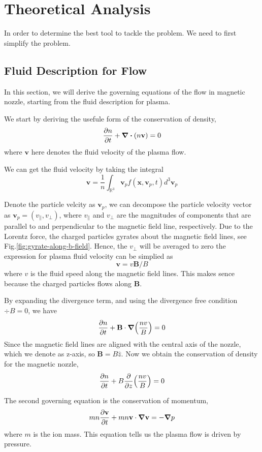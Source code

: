 \chapter{Theoretical Analysis} \label{chap:theoretical-analysis}
In order to determine the best tool to tackle the problem. We need to first simplify the problem.

\section{Fluid Description for Flow}
In this section, we will derive the governing equations of the flow in magnetic nozzle, starting from the fluid description for plasma.

We start by deriving the usefule form of the conservation of density,
\[ \pdv{n}{t} + \div(n\mathbf{v}) = 0 \]
where $\mathbf{v}$ here denotes the fluid velocity of the plasma flow.

We can get the fluid velocity by taking the integral
\[ \mathbf{v} = \frac{1}{n}\int_{\mathbb{R}^3} \mathbf{v}_p f(\mathbf{x}, \mathbf{v}_p, t) d^3\mathbf{v}_p \]

Denote the particle velcity as $\mathbf{v}_p$, we can decompose the particle velocity vector as $\mathbf{v}_p = (v_\parallel,v_\perp)$, where $v_\parallel$ and $v_\perp$ are the magnitudes of components that are parallel to and perpendicular to the magnetic field line, respectively. Due to the Lorentz force, the charged particles gyrates about the magnetic field lines, see Fig.\ref{fig:gyrate-along-b-field}. Hence, the $v_\perp$ will be averaged to zero the expression for plasma fluid velocity can be simplied as
\[\mathbf{v} = v\mathbf{B}/B\]
where $v$ is the fluid speed along the magnetic field lines. This makes sence because the charged particles flows along $\mathbf{B}$.

By expanding the divergence term, and using the divergence free condition $\div B=0$, we have
\[ \pdv{n}{t} + \mathbf{B}\cdot \grad(\frac{nv}{B}) = 0 \]
Since the magnetic field lines are aligned with the central axis of the nozzle, which we denote as z-axis, so $\mathbf{B} = B\hat{z}$. Now we obtain the conservation of density for the magnetic nozzle,
\begin{equation}
    \pdv{n}{t} + B\pdv{z}(\frac{nv}{B}) = 0
\end{equation}

The second governing equation is the conservation of momentum,
\[ mn\pdv{\mathbf{v}}{t} + mn\mathbf{v}\cdot\grad\mathbf{v} = -\grad p \]
where $m$ is the ion mass. This equation tells us the plasma flow is driven by pressure.

